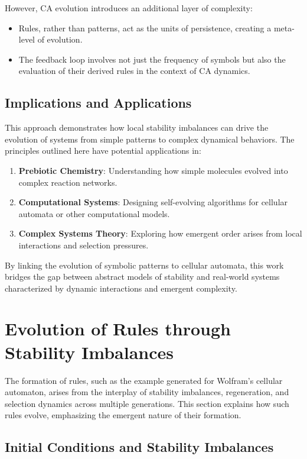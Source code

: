 \documentclass[entropy,article,submit,pdftex,moreauthors]{Definitions/mdpi}
\begin{document}
However, CA evolution introduces an additional layer of complexity:
\begin{itemize}
    \item Rules, rather than patterns, act as the units of persistence, creating a meta-level of evolution.
    \item The feedback loop involves not just the frequency of symbols but also the evaluation of their derived rules in the context of CA dynamics.
\end{itemize}

\subsection{Implications and Applications}

This approach demonstrates how local stability imbalances can drive the evolution of systems from simple patterns to complex dynamical behaviors. The principles outlined here have potential applications in:
\begin{enumerate}
    \item \textbf{Prebiotic Chemistry}: Understanding how simple molecules evolved into complex reaction networks.
    \item \textbf{Computational Systems}: Designing self-evolving algorithms for cellular automata or other computational models.
    \item \textbf{Complex Systems Theory}: Exploring how emergent order arises from local interactions and selection pressures.
\end{enumerate}

By linking the evolution of symbolic patterns to cellular automata, this work bridges the gap between abstract models of stability and real-world systems characterized by dynamic interactions and emergent complexity.

\section{Evolution of Rules through Stability Imbalances}

The formation of rules, such as the example generated for Wolfram’s cellular automaton, arises from the interplay of stability imbalances, regeneration, and selection dynamics across multiple generations. This section explains how such rules evolve, emphasizing the emergent nature of their formation.

\subsection{Initial Conditions and Stability Imbalances}
\end{document}
